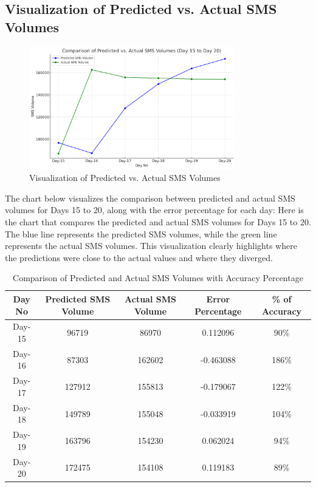 \documentclass[12pt]{book} %
\begin{document}
\subsection{Visualization of Predicted vs. Actual SMS Volumes}

\begin{figure}[h]
	\begin{center}
		\includegraphics[width=0.8\textwidth]{assets/result-predicted-vs-actual-sms-balance.png} 
	\end{center}
	\caption{Visualization of Predicted vs. Actual SMS Volumes} %
	\label{fig:result-predicted-vs-actual-sms-balance}
\end{figure}


The chart below visualizes the comparison between predicted and actual SMS volumes for Days 15 to 20, along with the error percentage for each day:
Here is the chart that compares the predicted and actual SMS volumes for Days 15 to 20. The blue line represents the predicted SMS volumes, while the green line represents the actual SMS volumes. This visualization clearly highlights where the predictions were close to the actual values and where they diverged.



\begin{table}[ht]
    \centering
    \caption{Comparison of Predicted and Actual SMS Volumes with Accuracy Percentage}
    \begin{adjustbox}{max width=\textwidth}
    \begin{tabular}{|c|c|c|c|c|}
    \hline
    \rowcolor{lightgray} \textbf{Day No} & \textbf{Predicted SMS Volume} & \textbf{Actual SMS Volume} & \textbf{Error Percentage} & \textbf{\% of Accuracy} \\
    \hline
    Day-15 & 96719 & 86970 & 0.112096 & 90\% \\
    \hline
    Day-16 & 87303 & 162602 & -0.463088 & 186\% \\
    \hline
    Day-17 & 127912 & 155813 & -0.179067 & 122\% \\
    \hline
    Day-18 & 149789 & 155048 & -0.033919 & 104\% \\
    \hline
    Day-19 & 163796 & 154230 & 0.062024 & 94\% \\
    \hline
    Day-20 & 172475 & 154108 & 0.119183 & 89\% \\
    \hline
    \end{tabular}
    \end{adjustbox}
    \label{tab:comparison}
\end{table}
\end{document}
